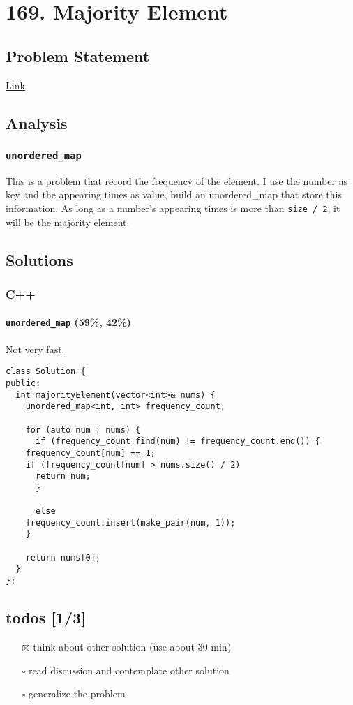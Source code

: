 \documentclass[12pt]{article}
\begin{document}
\section{169. Majority Element}
\label{sec:org80033ff}
\subsection{Problem Statement}
\label{sec:org54c95ab}
\href{https://leetcode.com/problems/majority-element/}{Link}
\subsection{Analysis}
\label{sec:org4a3ad0d}
\subsubsection{\texttt{unordered\_map}}
\label{sec:org2caf252}
This is a problem that record the frequency of the element. I use the number as key and the appearing times as value, build an unordered\_map that store this information. As long as a number's appearing times is more than \texttt{size / 2}, it will be the majority element.
\subsection{Solutions}
\label{sec:org17fd96c}
\subsubsection{C++}
\label{sec:orgd77c469}
\paragraph{\texttt{unordered\_map} (59\%, 42\%)}
\label{sec:orga58b283}
Not very fast.
\begin{verbatim}
class Solution {
public:
  int majorityElement(vector<int>& nums) {
    unordered_map<int, int> frequency_count;

    for (auto num : nums) {
      if (frequency_count.find(num) != frequency_count.end()) {
	frequency_count[num] += 1;
	if (frequency_count[num] > nums.size() / 2)
	  return num;
      }

      else
	frequency_count.insert(make_pair(num, 1));
    }

    return nums[0];
  }
};
\end{verbatim}
\subsection{todos [1/3]}
\label{sec:orgace3929}
\begin{itemize}
\item[{$\boxtimes$}] think about other solution (use about 30 min)
\item[{$\square$}] read discussion and contemplate other solution
\item[{$\square$}] generalize the problem
\end{itemize}
\end{document}
